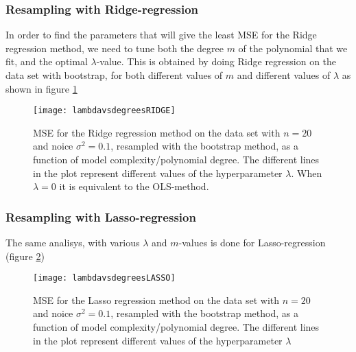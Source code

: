 \subsubsection{Resampling with Ridge-regression}
In order to find the parameters that will give the least MSE for the Ridge regression method, we need to tune both the degree $m$ of the polynomial that we fit, and the optimal $\lambda$-value. This is obtained by doing Ridge regression on the data set with bootstrap, for both different values of $m$ and different values of $\lambda$ as shown in figure \ref{fig:lambdavsdegreesRIDGE}

\begin{figure}[htbp]
	\centering
	\texttt{[image: lambdavsdegreesRIDGE]}
	\caption{MSE for the Ridge regression method on the data set with $n=20$ and noice $\sigma^2=0.1$, resampled with the bootstrap method, as a function of model complexity/polynomial degree. The different lines in the plot represent different values of the hyperparameter $\lambda$. When $\lambda=0$ it is equivalent to the OLS-method.}
	\label{fig:lambdavsdegreesRIDGE}
\end{figure}

\subsubsection{Resampling with Lasso-regression}
The same analisys, with various $\lambda$ and $m$-values is done for Lasso-regression (figure \ref{fig:lambdavsdegreesLASSO})
\begin{figure}[htbp]
	\centering
	\texttt{[image: lambdavsdegreesLASSO]}
	\caption{MSE for the Lasso regression method on the data set with $n=20$ and noice $\sigma^2=0.1$, resampled with the bootstrap method, as a function of model complexity/polynomial degree. The different lines in the plot represent different values of the hyperparameter $\lambda$}
	\label{fig:lambdavsdegreesLASSO}
\end{figure}

